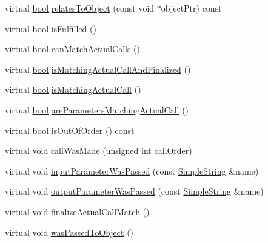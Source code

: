 \begin{DoxyCompactItemize}
virtual \hyperlink{avb__gptp_8h_af6a258d8f3ee5206d682d799316314b1}{bool} \hyperlink{class_mock_checked_expected_call_ad85c572873b63aa1ba90eebbf7b342ee}{relates\+To\+Object} (const void $\ast$object\+Ptr) const 
\item 
virtual \hyperlink{avb__gptp_8h_af6a258d8f3ee5206d682d799316314b1}{bool} \hyperlink{class_mock_checked_expected_call_ade46f4a7983da80ce623e6ba793aed28}{is\+Fulfilled} ()
\item 
virtual \hyperlink{avb__gptp_8h_af6a258d8f3ee5206d682d799316314b1}{bool} \hyperlink{class_mock_checked_expected_call_a0c1812c9bbd27ee2193e87ab3bf40617}{can\+Match\+Actual\+Calls} ()
\item 
virtual \hyperlink{avb__gptp_8h_af6a258d8f3ee5206d682d799316314b1}{bool} \hyperlink{class_mock_checked_expected_call_a43edc191e63e2d622c5c5904e76189b9}{is\+Matching\+Actual\+Call\+And\+Finalized} ()
\item 
virtual \hyperlink{avb__gptp_8h_af6a258d8f3ee5206d682d799316314b1}{bool} \hyperlink{class_mock_checked_expected_call_ac059128483bd37343d9d487617b0e9af}{is\+Matching\+Actual\+Call} ()
\item 
virtual \hyperlink{avb__gptp_8h_af6a258d8f3ee5206d682d799316314b1}{bool} \hyperlink{class_mock_checked_expected_call_a01fdc26233d1f10da9271532b33673ee}{are\+Parameters\+Matching\+Actual\+Call} ()
\item 
virtual \hyperlink{avb__gptp_8h_af6a258d8f3ee5206d682d799316314b1}{bool} \hyperlink{class_mock_checked_expected_call_acc2dd0463b77c46d7d4c8b39b2d43e02}{is\+Out\+Of\+Order} () const 
\item 
virtual void \hyperlink{class_mock_checked_expected_call_a6e2b7989a09a51036edbafebda0e012a}{call\+Was\+Made} (unsigned int call\+Order)
\item 
virtual void \hyperlink{class_mock_checked_expected_call_ac85425710e8d3685202951bf7fe15fa9}{input\+Parameter\+Was\+Passed} (const \hyperlink{class_simple_string}{Simple\+String} \&name)
\item 
virtual void \hyperlink{class_mock_checked_expected_call_aaa9004e2e55eb0efeaf953ee947ee8d1}{output\+Parameter\+Was\+Passed} (const \hyperlink{class_simple_string}{Simple\+String} \&name)
\item 
virtual void \hyperlink{class_mock_checked_expected_call_a4c18f2902dceaf212af310db05ae6837}{finalize\+Actual\+Call\+Match} ()
\item 
virtual void \hyperlink{class_mock_checked_expected_call_a9a3f1eec5ad45ccae942edb3073279de}{was\+Passed\+To\+Object} ()
\item 

\end{DoxyCompactItemize}
